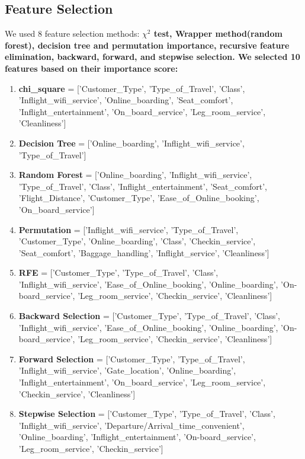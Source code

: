 \documentclass[11pt]{article}
\begin{document}
\subsection{Feature Selection}
We used 8 feature selection methods: \textbf{$\chi^2$ test, Wrapper method(random forest), decision tree and permutation importance, recursive feature elimination, backward, forward, and stepwise selection. We selected 10 features based on their importance score:}\vspace{1cm}

 \begin{enumerate}[label=\textbf{\arabic*.}]
  \item \textbf{chi\_square} = ['Customer\_Type', 'Type\_of\_Travel', 'Class', 'Inflight\_wifi\_service', 'Online\_boarding', 'Seat\_comfort', 'Inflight\_entertainment', 'On\_board\_service', 'Leg\_room\_service', 'Cleanliness']
  \item \textbf{Decision Tree} = ['Online\_boarding', 'Inflight\_wifi\_service', 'Type\_of\_Travel']
  \item \textbf{Random Forest} = ['Online\_boarding', 'Inflight\_wifi\_service', 'Type\_of\_Travel', 'Class', 'Inflight\_entertainment', 'Seat\_comfort', 'Flight\_Distance', 'Customer\_Type', 'Ease\_of\_Online\_booking', 'On\_board\_service']
  \item \textbf{Permutation} = ['Inflight\_wifi\_service', 'Type\_of\_Travel', 'Customer\_Type', 'Online\_boarding', 'Class', 'Checkin\_service', 'Seat\_comfort', 'Baggage\_handling', 'Inflight\_service', 'Cleanliness']
  \item \textbf{RFE} = ['Customer\_Type', 'Type\_of\_Travel', 'Class', 'Inflight\_wifi\_service', 'Ease\_of\_Online\_booking', 'Online\_boarding', 'On-board\_service', 'Leg\_room\_service', 'Checkin\_service', 'Cleanliness']
  \item \textbf{Backward Selection} = ['Customer\_Type', 'Type\_of\_Travel', 'Class', 'Inflight\_wifi\_service', 'Ease\_of\_Online\_booking', 'Online\_boarding', 'On-board\_service', 'Leg\_room\_service', 'Checkin\_service', 'Cleanliness']
  \item \textbf{Forward Selection} = ['Customer\_Type', 'Type\_of\_Travel', 'Inflight\_wifi\_service', 'Gate\_location', 'Online\_boarding', 'Inflight\_entertainment', 'On\_board\_service', 'Leg\_room\_service', 'Checkin\_service', 'Cleanliness']
  \item \textbf{Stepwise Selection} = ['Customer\_Type', 'Type\_of\_Travel', 'Class', 'Inflight\_wifi\_service', 'Departure/Arrival\_time\_convenient', 'Online\_boarding', 'Inflight\_entertainment', 'On-board\_service', 'Leg\_room\_service', 'Checkin\_service']
\end{enumerate}
\end{document}
